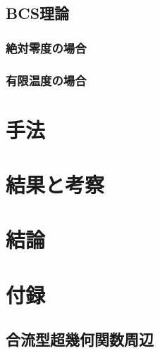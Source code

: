 \documentclass[a4paper]{jsarticle}
\begin{document}
\subsection{BCS理論}
\subsubsection{絶対零度の場合}
\subsubsection{有限温度の場合}
\section{手法}
\section{結果と考察}
\section{結論}



\section{付録}
\subsection{合流型超幾何関数周辺}
\end{document}
